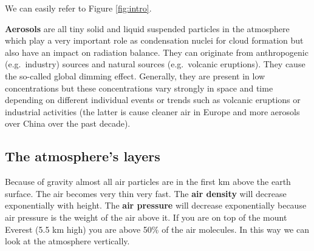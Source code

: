 \documentclass[oneside]{book}
\begin{document}
We can easily refer to Figure \ref{fig:intro}.

\textbf{Aerosols} are all tiny solid and liquid suspended particles in
the atmosphere which play a very important role as condensation nuclei
for cloud formation but also have an impact on radiation balance. They
can originate from anthropogenic (e.g.~industry) sources and natural
sources (e.g.~volcanic eruptions). They cause the so-called global
dimming effect. Generally, they are present in low concentrations but
these concentrations vary strongly in space and time depending on
different individual events or trends such as volcanic eruptions or
industrial activities (the latter is cause cleaner air in Europe and
more aerosols over China over the past decade).

\subsection{The atmosphere's layers}\label{the-atmospheres-layers}

Because of gravity almost all air particles are in the first km above
the earth surface. The air becomes very thin very fast. The \textbf{air
density} will decrease exponentially with height. The \textbf{air
pressure} will decrease exponentially because air pressure is the weight
of the air above it. If you are on top of the mount Everest (5.5 km
high) you are above 50\% of the air molecules. In this way we can look
at the atmosphere vertically.
\end{document}
